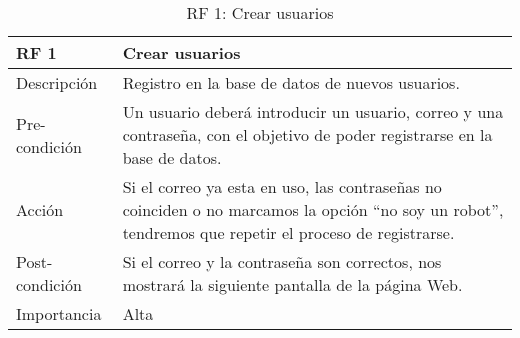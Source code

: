 \begin{table}[htbp]
	\begin{center}
		\begin{tabular}{|l|p{10cm}|}
		\hline
			\textbf{RF 1} & \textbf{Crear usuarios}                                                                                                                        			\\ \hline
			Descripción & Registro en la base de datos de nuevos usuarios.                                                                                                   \\ \hline
			Pre-condición & Un usuario deberá introducir un usuario, correo y una contraseña, con el objetivo de poder registrarse en la base de datos.\\ \hline
			Acción & Si el correo ya esta en uso, las contraseñas no coinciden o no marcamos la opción ``no soy un robot'', tendremos que repetir el proceso de registrarse. \\ \hline
			Post-condición  & Si el correo y la contraseña son correctos, nos mostrará la siguiente pantalla de la página Web.                                                     			\\ \hline
			Importancia & Alta                                                                                                                           \\ \hline
		\end{tabular}
	\caption{RF 1: Crear usuarios}
	\label{tabla:tablaB1}
	\end{center}
\end{table}

